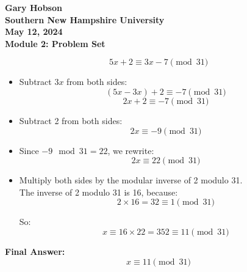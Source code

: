 \documentclass[12pt]{article}
\begin{document}
\begin{center}
    \textbf{Gary Hobson}\\
    \textbf{Southern New Hampshire University} \\
    \textbf{May 12, 2024} \\
    \textbf{Module 2: Problem Set} \\
\end{center}


\[
5x + 2 \equiv 3x - 7 \pmod{31}
\]



\begin{itemize}
    \item Subtract \( 3x \) from both sides:
    \[
    (5x - 3x) + 2 \equiv -7 \pmod{31}
    \]
    \[
    2x + 2 \equiv -7 \pmod{31}
    \]

    \item Subtract 2 from both sides:
    \[
    2x \equiv -9 \pmod{31}
    \]

    \item Since \( -9 \mod 31 = 22 \), we rewrite:
    \[
    2x \equiv 22 \pmod{31}
    \]

    \item Multiply both sides by the modular inverse of 2 modulo 31. \\
    The inverse of 2 modulo 31 is 16, because:
    \[
    2 \times 16 = 32 \equiv 1 \pmod{31}
    \]

    So:
    \[
    x \equiv 16 \times 22 = 352 \equiv 11 \pmod{31}
    \]
\end{itemize}

\textbf{Final Answer:}
\[
x \equiv 11 \pmod{31}
\]
\end{document}
